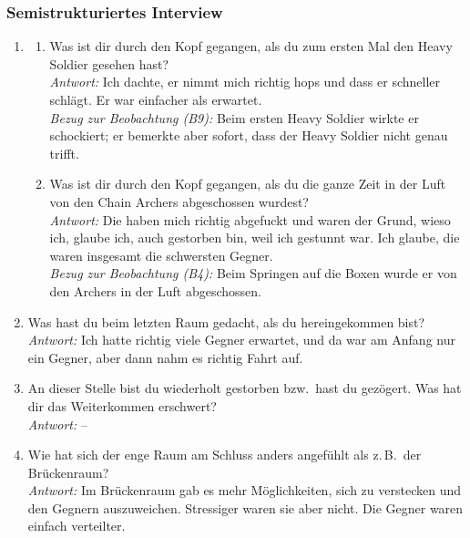 \documentclass[../Main.tex]{subfiles}
\begin{document}
\subsubsection{Semistrukturiertes Interview}

\begin{enumerate}[label=\textbf{I\arabic*}, leftmargin=1.5cm, itemsep=1em]
\item
\begin{enumerate}[label=\alph*), itemsep=0.6em]
    \item Was ist dir durch den Kopf gegangen, als du zum ersten Mal den Heavy Soldier gesehen hast? \\
        \textit{Antwort:} Ich dachte, er nimmt mich richtig hops und dass er schneller schlägt. Er war einfacher als erwartet. \\
        \textit{Bezug zur Beobachtung (B9):} Beim ersten Heavy Soldier wirkte er schockiert; er bemerkte aber sofort, dass der Heavy Soldier nicht genau trifft.
    \item Was ist dir durch den Kopf gegangen, als du die ganze Zeit in der Luft von den Chain Archers abgeschossen wurdest? \\
        \textit{Antwort:} Die haben mich richtig abgefuckt und waren der Grund, wieso ich, glaube ich, auch gestorben bin, weil ich gestunnt war. Ich glaube, die waren insgesamt die schwersten Gegner. \\
        \textit{Bezug zur Beobachtung (B4):} Beim Springen auf die Boxen wurde er von den Archers in der Luft abgeschossen.
\end{enumerate}

\item Was hast du beim letzten Raum gedacht, als du hereingekommen bist? \\
    \textit{Antwort:} Ich hatte richtig viele Gegner erwartet, und da war am Anfang nur ein Gegner, aber dann nahm es richtig Fahrt auf.

\item An dieser Stelle bist du wiederholt gestorben bzw.\ hast du gezögert. Was hat dir das Weiterkommen erschwert? \\
    \textit{Antwort:} --

\item Wie hat sich der enge Raum am Schluss anders angefühlt als z.\,B.\ der Brückenraum? \\
    \textit{Antwort:} Im Brückenraum gab es mehr Möglichkeiten, sich zu verstecken und den Gegnern auszuweichen. Stressiger waren sie aber nicht. Die Gegner waren einfach verteilter.


\end{enumerate}
\end{document}
